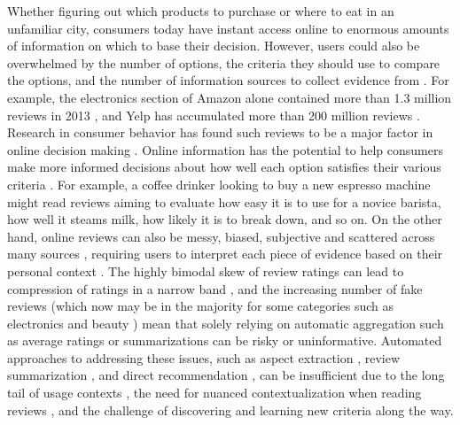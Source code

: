 Whether figuring out which products to purchase or where to eat in an unfamiliar city, consumers today have instant access online to enormous amounts of information on which to base their decision. However, users could also be overwhelmed by the number of options, the criteria they should use to compare the options, and the number of information sources to collect evidence from \cite{simon1996designing,schwartz2004paradox}. For example, the electronics section of Amazon alone contained more than 1.3 million reviews in 2013 \cite{mcauley2013hidden}, and Yelp has accumulated more than 200 million reviews \cite{Yelpcum70:online}. Research in consumer behavior has found such reviews to be a major factor in online decision making \cite{gan2012helpfulness,mudambi2010research}. Online information has the potential to help consumers make more informed decisions about how well each option satisfies their various criteria \cite{de2016navigating}. For example, a coffee drinker looking to buy a new espresso machine might read reviews aiming to evaluate how easy it is to use for a novice barista, how well it steams milk, how likely it is to break down, and so on. On the other hand, online reviews can also be messy, biased, subjective and scattered across many sources \cite{hoch1986consumer, racherla2012perceived,zhang2012human,chen2015tripplanner}, requiring users to interpret each piece of evidence based on their personal context \cite{shugan1980cost}. The highly bimodal skew of review ratings can lead to compression of ratings in a narrow band \cite{hu2009overcoming}, and the increasing number of fake reviews (which now may be in the majority for some categories such as electronics and beauty \cite{Howmerch65:online}) mean that solely relying on automatic aggregation such as average ratings or summarizations can be risky or uninformative. Automated approaches to addressing these issues, such as aspect extraction \cite{manek2017aspect,yu2011aspect}, review summarization \cite{hu2004mining,li2010structure}, and direct recommendation \cite{bobadilla2013recommender}, can be insufficient due to the long tail of usage contexts \cite{bernstein2012direct}, the need for nuanced contextualization when reading reviews \cite{chang2019searchlens}, and the challenge of discovering and learning new criteria along the way.

